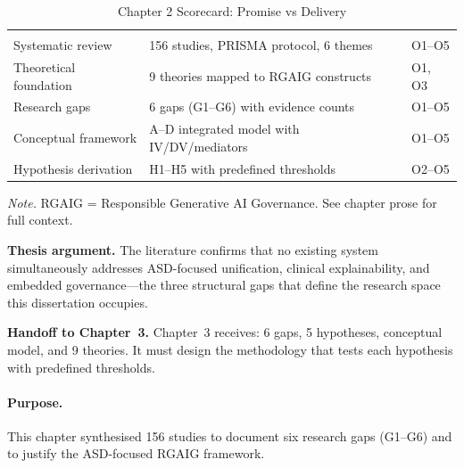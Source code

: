 {\tablestripes\tablefontsize
\begin{xltabular}{\textwidth}{@{} >{\raggedright\arraybackslash}p{3.0cm} L >{\centering\arraybackslash}p{1.5cm} @{}}
\caption[Chapter 2 Scorecard]{Chapter 2 Scorecard: Promise vs Delivery}\label{tab:ch2_scorecard} \\
\toprule
{} &  &  \\
\midrule
\endfirsthead
\toprule
{} &  &  \\
\midrule
\endhead
\bottomrule
\endlastfoot
Systematic review & 156 studies, PRISMA protocol, 6 themes & O1--O5 \\
\addlinespace
Theoretical foundation & 9 theories mapped to RGAIG constructs & O1, O3 \\
\addlinespace
Research gaps & 6 gaps (G1--G6) with evidence counts & O1--O5 \\
\addlinespace
Conceptual framework & A--D integrated model with IV/DV/mediators & O1--O5 \\
\addlinespace
Hypothesis derivation & H1--H5 with predefined thresholds & O2--O5 \\
\end{xltabular}}
\vspace{0.3em}\noindent\textit{Note.} RGAIG = Responsible Generative AI Governance. See chapter prose for full context.

\noindent\textbf{Thesis argument.} The literature confirms that no existing system simultaneously addresses ASD-focused unification, clinical explainability, and embedded governance---the three structural gaps that define the research space this dissertation occupies.

\noindent\textbf{Handoff to Chapter~3.} Chapter~3 receives: 6 gaps, 5 hypotheses, conceptual model, and 9 theories. It must design the methodology that tests each hypothesis with predefined thresholds.


\paragraph{Purpose.}
This chapter synthesised 156 studies to document six research gaps (G1--G6) and to justify the ASD-focused RGAIG framework.

